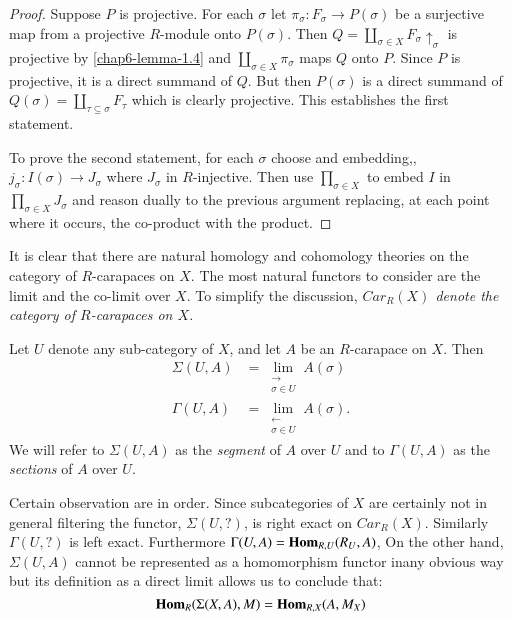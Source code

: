 \begin{proof}
Suppose $P$ is projective. For each $\sigma$ let $\pi_{\sigma}: F_{\sigma}\rightarrow P(\sigma)$ be a surjective map from a projective $R$-module onto  $P(\sigma)$. Then $Q= \coprod_{\sigma \in X}F_{\sigma} \uparrow_{\sigma}$ is projective by \ref{chap6-lemma-1.4} and $\coprod_{\sigma \in X}\pi_{\sigma}$ maps $Q$ onto $P$. Since $P$ is projective, it is a direct summand of $Q$. But then $P(\sigma)$ is a  direct summand of $Q(\sigma) = \coprod_{\tau \subseteq \sigma}F_{\tau}$ which is clearly projective. This establishes the first statement.

To prove the second statement, for each $\sigma$ choose and embedding,, $j_{\sigma} : I(\sigma) \rightarrow J_{\sigma}$ where $J_{\sigma}$ in $R$-injective. Then use $\prod_{\sigma\in X}$ to embed $I$ in $\prod_{\sigma \in X}J_{\sigma}$ and reason dually to the previous argument replacing, at each point where it occurs, the co-product with the product. 
\end{proof}

It is clear that there are natural homology and cohomology theories on the category of $R$-carapaces on $X$. The most natural functors to consider are the limit and the co-limit over $X$. To simplify the discussion, \textit{$C ar_{R}(X)$ denote the category of $R$-carapaces on $X$.}

\begin{definition}\label{chap6-prop-1.7}
Let $U$ denote any sub-category of $X$, and let $A$ be an $R$-carapace on $X$. Then
\begin{align*}
\Sigma (U, A) &= \lim\limits_{\substack{\longrightarrow \\ \sigma \in U}}A(\sigma)\\
\Gamma (U, A) &= \lim\limits_{\substack{\longleftarrow \\ \sigma \in U}}A(\sigma).
\end{align*}
We will refer to $\Sigma(U, A)$ as the \textit{segment} of $A$ over $U$ and to $\Gamma(U, A)$ as the \textit{sections} of $A$ over $U$.
\end{definition}

Certain observation are in order. Since subcategories of $X$ are certainly not in general filtering the functor, $\Sigma(U, ?)$, is right exact on $C ar_{R}(X)$. Similarly $\Gamma(U, ?)$ is left exact. Furthermore $\Gamma(U, A) = \operatorname{\mathbf{Hom}}_{R, U}(R_{U}, A)$, On the other hand, $\Sigma(U, A)$ cannot be represented as a homomorphism functor in\pageoriginale any obvious way but its definition as a direct limit allows us to conclude that:
$$
\operatorname{\mathbf{Hom}}_{R}(\Sigma(X, A), M) = \operatorname{\mathbf{Hom}}_{R, X}(A, M_{X})
$$ 


